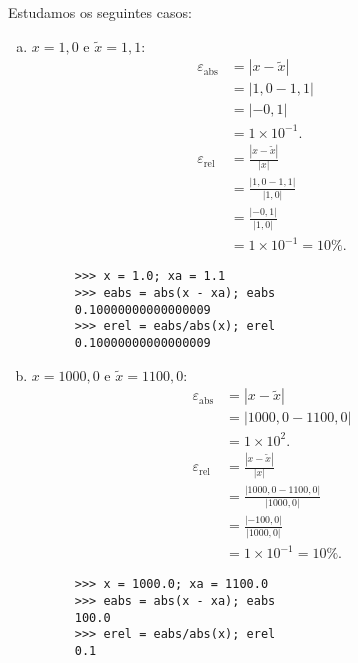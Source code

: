 \begin{ex}\label{ex:medidas_de_erros}
  Estudamos os seguintes casos:
  \begin{enumerate}[a)]
  \item $x=1,0$ e $\tilde{x} = 1,1$:
    \begin{align}
      \varepsilon_{\text{abs}} &= |x - \tilde{x}| \\
                        &= |1,0 - 1,1|\\
                        &= |-0,1|\\
                        &= 1\times 10^{-1}.\\
      \varepsilon_{\text{rel}} &= \frac{|x - \tilde{x}|}{|x|} \\
                        &= \frac{|1,0-1,1|}{|1,0|}\\
                        &= \frac{|-0,1|}{|1,0|}\\
                        &= 1\times 10^{-1} = 10\%.
    \end{align}
    
    \begin{lstlisting}
      >>> x = 1.0; xa = 1.1
      >>> eabs = abs(x - xa); eabs
      0.10000000000000009
      >>> erel = eabs/abs(x); erel
      0.10000000000000009
    \end{lstlisting}
    
  \item $x=1000,0$ e $\tilde{x} = 1100,0$:
    \begin{align}
      \varepsilon_{\text{abs}} &= |x - \tilde{x}| \\
                        &= |1000,0 - 1100,0|\\
                        &= 1\times 10^2.\\
      \varepsilon_{\text{rel}} &= \frac{|x - \tilde{x}|}{|x|} \\
                        &= \frac{|1000,0 - 1100,0|}{|1000,0|}\\
                        &= \frac{|-100,0|}{|1000,0|}\\
                        &= 1\times 10^{-1} = 10\%.
    \end{align}
    
    \begin{lstlisting}
      >>> x = 1000.0; xa = 1100.0
      >>> eabs = abs(x - xa); eabs
      100.0
      >>> erel = eabs/abs(x); erel
      0.1
    \end{lstlisting}
    
  \end{enumerate}
\end{ex}

